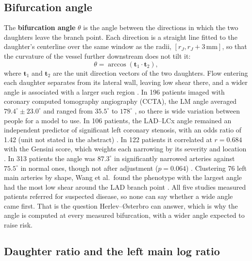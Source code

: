 \subsection{Bifurcation angle}

The \textbf{bifurcation angle} $\theta$ is the angle between the directions in which the two daughters leave the branch point.
Each direction is a straight line fitted to the daughter's centerline over the same window as the radii, $[r_J, r_J + 3\,\mathrm{mm}]$, so that the curvature of the vessel further downstream does not tilt it:
\begin{equation}
  \theta = \arccos\left(\mathbf{t}_1 \cdot \mathbf{t}_2\right),
  \label{eq:risk-angle}
\end{equation}
where $\mathbf{t}_1$ and $\mathbf{t}_2$ are the unit direction vectors of the two daughters.
Flow entering each daughter separates from its lateral wall, leaving low shear there, and a wider angle is associated with a larger such region \cite{murasato2022bifurcation}.
In 196 patients imaged with coronary computed tomography angiography (CCTA), the LM angle averaged $79.4^\circ \pm 23.0^\circ$ and ranged from $35.5^\circ$ to $178^\circ$ \cite{temov2016bifurcation}, so there is wide variation between people for a model to use.
In 106 patients, the LAD--LCx angle remained an independent predictor of significant left coronary stenosis, with an odds ratio of 1.42 (unit not stated in the abstract) \cite{cui2017bifurcation}.
In 122 patients it correlated at $r = 0.684$ with the Gensini score, which weights each narrowing by its severity and location \cite{mansouri2024bifurcation}.
In 313 patients the angle was $87.3^\circ$ in significantly narrowed arteries against $75.5^\circ$ in normal ones, though not after adjustment ($p = 0.064$) \cite{juan2017bifurcation}.
Clustering 76 left main arteries by shape, Wang et al.\ found the phenotype with the largest angle had the most low shear around the LAD branch point \cite{wang2024lmphenotypes}.
All five studies measured patients referred for suspected disease, so none can say whether a wide angle came first.
That is the question Herlev--{\O}sterbro can answer, which is why the angle is computed at every measured bifurcation, with a wider angle expected to raise risk.

\subsection{Daughter ratio and the left main log ratio}


